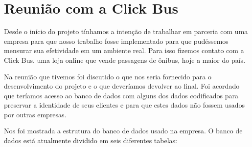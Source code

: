 \chapter[Reunião com a Click Bus]{Reunião com a Click Bus}
\label{chap:Reuniao_com_a_click_bus}

Desde o início do projeto tínhamos a intenção de trabalhar em parceria com uma empresa para que nosso trabalho fosse implementado para que pudéssemos mensurar sua efetividade em um ambiente real. Para isso fizemos contato com a Click Bus, uma loja online que vende passagens de ônibus, hoje a maior do país.

Na reunião que tivemos foi discutido o que nos seria fornecido para o desenvolvimento do projeto e o que deveríamos devolver ao final. Foi acordado que teríamos acesso ao banco de dados com alguns dos dados codificados para preservar a identidade de seus clientes e para que estes dados não fossem usados por outras empresas.

Nos foi mostrada a estrutura do banco de dados usado na empresa. O banco de dados está atualmente dividido em  seis diferentes tabelas:

